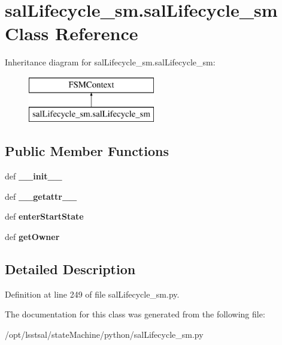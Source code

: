 \hypertarget{classsal_lifecycle__sm_1_1sal_lifecycle__sm}{\section{sal\-Lifecycle\-\_\-sm.\-sal\-Lifecycle\-\_\-sm Class Reference}
\label{classsal_lifecycle__sm_1_1sal_lifecycle__sm}
}
Inheritance diagram for sal\-Lifecycle\-\_\-sm.\-sal\-Lifecycle\-\_\-sm\-:\begin{figure}[H]
\begin{center}
\leavevmode
\includegraphics[height=2.000000cm]{classsal_lifecycle__sm_1_1sal_lifecycle__sm}
\end{center}
\end{figure}
\subsection*{Public Member Functions}
\begin{DoxyCompactItemize}
\item 
\hypertarget{classsal_lifecycle__sm_1_1sal_lifecycle__sm_a3f2d1ee1c4f6625ccc008f1d10fac4ab}{def {\bfseries \-\_\-\-\_\-init\-\_\-\-\_\-}}\label{classsal_lifecycle__sm_1_1sal_lifecycle__sm_a3f2d1ee1c4f6625ccc008f1d10fac4ab}

\item 
\hypertarget{classsal_lifecycle__sm_1_1sal_lifecycle__sm_aef34790057f8ab81af6217354793e0b1}{def {\bfseries \-\_\-\-\_\-getattr\-\_\-\-\_\-}}\label{classsal_lifecycle__sm_1_1sal_lifecycle__sm_aef34790057f8ab81af6217354793e0b1}

\item 
\hypertarget{classsal_lifecycle__sm_1_1sal_lifecycle__sm_a1e0a078e9ba8723f33ce6e89f478bff8}{def {\bfseries enter\-Start\-State}}\label{classsal_lifecycle__sm_1_1sal_lifecycle__sm_a1e0a078e9ba8723f33ce6e89f478bff8}

\item 
\hypertarget{classsal_lifecycle__sm_1_1sal_lifecycle__sm_a0e902cb5dd1524880a0e2753ecde7fec}{def {\bfseries get\-Owner}}\label{classsal_lifecycle__sm_1_1sal_lifecycle__sm_a0e902cb5dd1524880a0e2753ecde7fec}

\end{DoxyCompactItemize}


\subsection{Detailed Description}


Definition at line 249 of file sal\-Lifecycle\-\_\-sm.\-py.



The documentation for this class was generated from the following file\-:\begin{DoxyCompactItemize}
\item 
/opt/lsstsal/state\-Machine/python/sal\-Lifecycle\-\_\-sm.\-py\end{DoxyCompactItemize}
